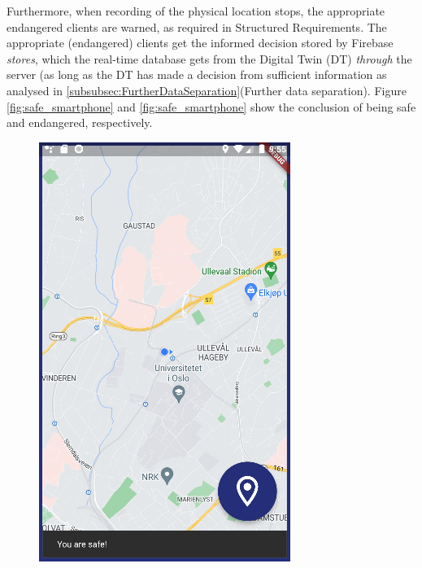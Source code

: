 \documentclass{article}
\begin{document}
Furthermore, when recording of the physical location stops, the appropriate endangered clients are warned, as required in Structured Requirements. The appropriate (endangered) clients get the informed decision stored by Firebase \emph{stores}, which the real-time database gets from the Digital Twin (DT) \emph{through} the server (as long as the DT has made a decision from sufficient information as analysed in \ref{subsubsec:FurtherDataSeparation}(Further data separation). Figure \ref{fig:safe_smartphone} and \ref{fig:safe_smartphone} show the conclusion of being safe and endangered, respectively.

\begin{figure}[H]
    \centering
    \begin{minipage}[c]{0.40\linewidth}
        \includegraphics[width=\linewidth]{graphics/safe_smartphone.png}

\end{minipage}
\end{figure}
\end{document}

